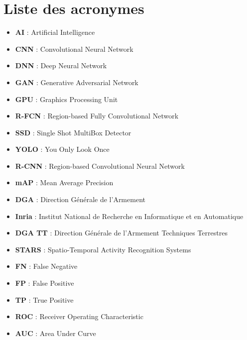 \chapter*{Liste des acronymes}



\begin{itemize}
    \item \textbf{AI} : Artificial Intelligence
    \item \textbf{CNN} : Convolutional Neural Network
    \item \textbf{DNN} : Deep Neural Network
    \item \textbf{GAN} : Generative Adversarial Network
    \item \textbf{GPU} : Graphics Processing Unit
    \item \textbf{R-FCN} : Region-based Fully Convolutional Network
    \item \textbf{SSD} : Single Shot MultiBox Detector
    \item \textbf{YOLO} : You Only Look Once
    \item \textbf{R-CNN} : Region-based Convolutional Neural Network
    \item \textbf{mAP} : Mean Average Precision
    \item \textbf{DGA} : Direction Générale de l'Armement
    \item \textbf{Inria} : Institut National de Recherche en Informatique et en Automatique
    \item \textbf{DGA TT} : Direction Générale de l'Armement Techniques Terrestres
    \item \textbf{STARS} : Spatio-Temporal Activity Recognition Systems
    \item \textbf{FN} : False Negative
    \item \textbf{FP} : False Positive
    \item \textbf{TP} : True Positive
    \item \textbf{ROC} : Receiver Operating Characteristic
    \item \textbf{AUC} : Area Under Curve
\end{itemize}